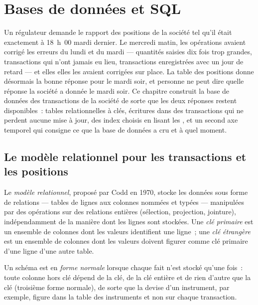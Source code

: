\chapter{Bases de données et SQL}\label{ch:pl:databases-and-sql}

Un régulateur demande le rapport des positions de la société tel qu'il était exactement à 18~h~00 mardi dernier. Le mercredi matin, les opérations avaient corrigé
les erreurs du lundi et du mardi --- quantités saisies dix fois trop grandes, transactions qui n'ont jamais eu lieu, transactions enregistrées avec un jour de retard --- et elles
elles les avaient corrigées sur place. La table des positions donne désormais la bonne réponse pour le mardi soir, et personne ne peut dire quelle réponse la société a donnée
le mardi soir. Ce chapitre construit la base de données des transactions de la société de sorte que les deux réponses restent disponibles~: tables relationnelles à clés, écritures dans
des transactions qui ne perdent aucune mise à jour, des index choisis en lisant les , et un second axe temporel qui consigne ce que la base de données a cru
et à quel moment.

\section{Le modèle relationnel pour les transactions et les positions}

\begin{definition}\label{def:pl:databases-and-sql:relational}
Le \emph{modèle relationnel}, proposé par Codd en 1970, stocke les données sous forme de relations --- tables de lignes aux
colonnes nommées et typées --- manipulées par des opérations sur des relations entières (sélection, projection, jointure), indépendamment de la manière dont les lignes sont stockées. Une \emph{clé
primaire} est un ensemble de colonnes dont les valeurs identifient une ligne~; une \emph{clé étrangère} est un ensemble de colonnes dont
les valeurs doivent figurer comme clé primaire d'une ligne d'une autre table.
\end{definition}

\begin{definition}\label{def:pl:databases-and-sql:normal}
Un schéma est en \emph{forme normale} lorsque chaque fait n'est stocké qu'une fois~: toute colonne hors clé dépend de la clé, de la clé entière
et de rien d'autre que la clé (troisième forme normale), de sorte que la devise d'un instrument, par exemple, figure dans la table des instruments et non sur chaque transaction.
\end{definition}

